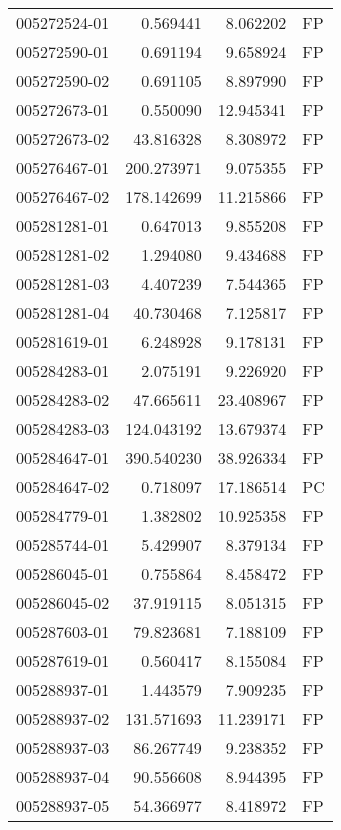 \begin{tabular}{lrrl}
005272524-01 &    0.569441 &       8.062202 &   FP \\
005272590-01 &    0.691194 &       9.658924 &   FP \\
005272590-02 &    0.691105 &       8.897990 &   FP \\
005272673-01 &    0.550090 &      12.945341 &   FP \\
005272673-02 &   43.816328 &       8.308972 &   FP \\
005276467-01 &  200.273971 &       9.075355 &   FP \\
005276467-02 &  178.142699 &      11.215866 &   FP \\
005281281-01 &    0.647013 &       9.855208 &   FP \\
005281281-02 &    1.294080 &       9.434688 &   FP \\
005281281-03 &    4.407239 &       7.544365 &   FP \\
005281281-04 &   40.730468 &       7.125817 &   FP \\
005281619-01 &    6.248928 &       9.178131 &   FP \\
005284283-01 &    2.075191 &       9.226920 &   FP \\
005284283-02 &   47.665611 &      23.408967 &   FP \\
005284283-03 &  124.043192 &      13.679374 &   FP \\
005284647-01 &  390.540230 &      38.926334 &   FP \\
005284647-02 &    0.718097 &      17.186514 &   PC \\
005284779-01 &    1.382802 &      10.925358 &   FP \\
005285744-01 &    5.429907 &       8.379134 &   FP \\
005286045-01 &    0.755864 &       8.458472 &   FP \\
005286045-02 &   37.919115 &       8.051315 &   FP \\
005287603-01 &   79.823681 &       7.188109 &   FP \\
005287619-01 &    0.560417 &       8.155084 &   FP \\
005288937-01 &    1.443579 &       7.909235 &   FP \\
005288937-02 &  131.571693 &      11.239171 &   FP \\
005288937-03 &   86.267749 &       9.238352 &   FP \\
005288937-04 &   90.556608 &       8.944395 &   FP \\
005288937-05 &   54.366977 &       8.418972 &   FP \\

\end{tabular}
